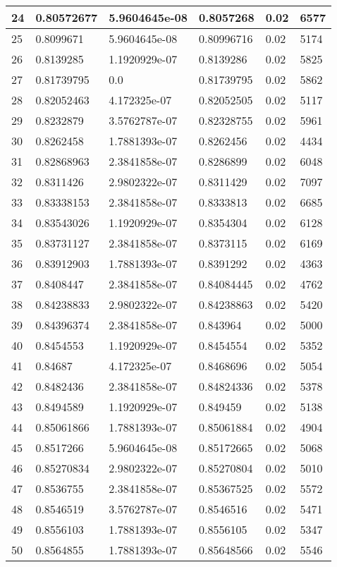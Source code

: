 \begin{longtable}{|l|l|l|l|l|l|}
24 & 0.80572677 & 5.9604645e-08 & 0.8057268 & 0.02 & 6577 \\ \hline 
25 & 0.8099671 & 5.9604645e-08 & 0.80996716 & 0.02 & 5174 \\ \hline 
26 & 0.8139285 & 1.1920929e-07 & 0.8139286 & 0.02 & 5825 \\ \hline 
27 & 0.81739795 & 0.0 & 0.81739795 & 0.02 & 5862 \\ \hline 
28 & 0.82052463 & 4.172325e-07 & 0.82052505 & 0.02 & 5117 \\ \hline 
29 & 0.8232879 & 3.5762787e-07 & 0.82328755 & 0.02 & 5961 \\ \hline 
30 & 0.8262458 & 1.7881393e-07 & 0.8262456 & 0.02 & 4434 \\ \hline 
31 & 0.82868963 & 2.3841858e-07 & 0.8286899 & 0.02 & 6048 \\ \hline 
32 & 0.8311426 & 2.9802322e-07 & 0.8311429 & 0.02 & 7097 \\ \hline 
33 & 0.83338153 & 2.3841858e-07 & 0.8333813 & 0.02 & 6685 \\ \hline 
34 & 0.83543026 & 1.1920929e-07 & 0.8354304 & 0.02 & 6128 \\ \hline 
35 & 0.83731127 & 2.3841858e-07 & 0.8373115 & 0.02 & 6169 \\ \hline 
36 & 0.83912903 & 1.7881393e-07 & 0.8391292 & 0.02 & 4363 \\ \hline 
37 & 0.8408447 & 2.3841858e-07 & 0.84084445 & 0.02 & 4762 \\ \hline 
38 & 0.84238833 & 2.9802322e-07 & 0.84238863 & 0.02 & 5420 \\ \hline 
39 & 0.84396374 & 2.3841858e-07 & 0.843964 & 0.02 & 5000 \\ \hline 
40 & 0.8454553 & 1.1920929e-07 & 0.8454554 & 0.02 & 5352 \\ \hline 
41 & 0.84687 & 4.172325e-07 & 0.8468696 & 0.02 & 5054 \\ \hline 
42 & 0.8482436 & 2.3841858e-07 & 0.84824336 & 0.02 & 5378 \\ \hline 
43 & 0.8494589 & 1.1920929e-07 & 0.849459 & 0.02 & 5138 \\ \hline 
44 & 0.85061866 & 1.7881393e-07 & 0.85061884 & 0.02 & 4904 \\ \hline 
45 & 0.8517266 & 5.9604645e-08 & 0.85172665 & 0.02 & 5068 \\ \hline 
46 & 0.85270834 & 2.9802322e-07 & 0.85270804 & 0.02 & 5010 \\ \hline 
47 & 0.8536755 & 2.3841858e-07 & 0.85367525 & 0.02 & 5572 \\ \hline 
48 & 0.8546519 & 3.5762787e-07 & 0.8546516 & 0.02 & 5471 \\ \hline 
49 & 0.8556103 & 1.7881393e-07 & 0.8556105 & 0.02 & 5347 \\ \hline 
50 & 0.8564855 & 1.7881393e-07 & 0.85648566 & 0.02 & 5546 \\ \hline 
\end{longtable}